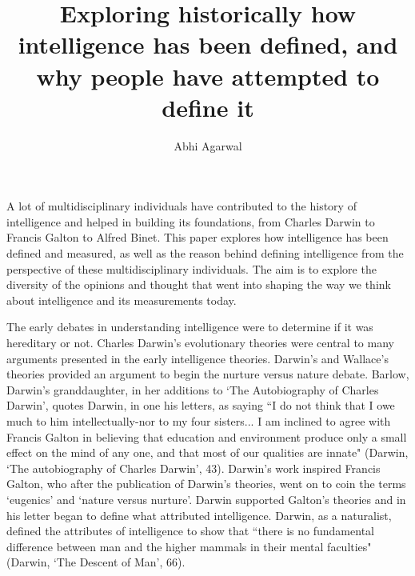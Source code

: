 \documentclass[12pt, oneside]{article}
\title{Exploring historically how intelligence has been defined, and why people have attempted to define it\vspace{-0.4cm}}
\author{Abhi Agarwal\vspace{-1cm}}
\date{}
\begin{document}
\maketitle

\par A lot of multidisciplinary individuals have contributed to the history of intelligence and helped in building its foundations, from Charles Darwin to Francis Galton to Alfred Binet. This paper explores how intelligence has been defined and measured, as well as the reason behind defining intelligence from the perspective of these multidisciplinary individuals. The aim is to explore the diversity of the opinions and thought that went into shaping the way we think about intelligence and its measurements today.

\par The early debates in understanding intelligence were to determine if it was hereditary or not. Charles Darwin's evolutionary theories were central to many arguments presented in the early intelligence theories. Darwin's and Wallace's theories provided an argument to begin the nurture versus nature debate. Barlow, Darwin's granddaughter, in her additions to `The Autobiography of Charles Darwin', quotes Darwin, in one his letters, as saying ``I do not think that I owe much to him intellectually-nor to my four sisters... I am inclined to agree with Francis Galton in believing that education and environment produce only a small effect on the mind of any one, and that most of our qualities are innate" (Darwin, `The autobiography of Charles Darwin', 43). Darwin's work inspired Francis Galton, who after the publication of Darwin's theories, went on to coin the terms `eugenics' and `nature versus nurture'. Darwin supported Galton's theories and in his letter began to define what attributed intelligence. Darwin, as a naturalist, defined the attributes of intelligence to show that ``there is no fundamental difference between man and the higher mammals in their mental faculties" (Darwin, `The Descent of Man', 66).
\end{document}
